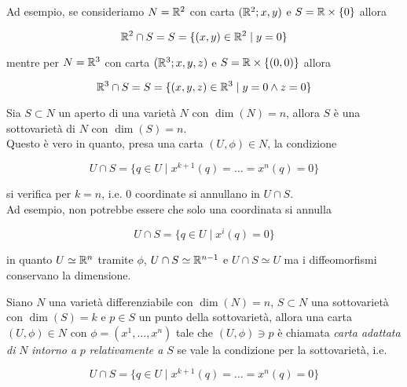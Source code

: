 Ad esempio, se consideriamo $ N = \mathbb{R}^{2} $ con carta $ (\mathbb{R}^{2};x,y) $ e $ S = \mathbb{R} \times \{0\} $ allora

\begin{equation}
	\mathbb{R}^{2} \cap S = S = \{ (x,y) \in \mathbb{R}^{2} \mid y=0 \}
\end{equation}

mentre per $ N = \mathbb{R}^{3} $ con carta $ (\mathbb{R}^{3};x,y,z) $ e $ S = \mathbb{R} \times \{(0,0)\} $ allora

\begin{equation}
	\mathbb{R}^{3} \cap S = S = \{ (x,y,z) \in \mathbb{R}^{3} \mid y = 0 \wedge z = 0 \}
\end{equation}

\begin{remark}\label{subvar-open}
	Sia $ S \subset N $ un aperto di una varietà $ N $ con $ \dim(N)=n $, allora $ S $ è una sottovarietà di $ N $ con $ \dim(S)=n $.\\
	Questo è vero in quanto, presa una carta $ (U,\phi) \in N $, la condizione
	
	\begin{equation}
		U \cap S = \{ q \in U \mid x^{k+1}(q) = \dots = x^{n}(q) = 0 \}
	\end{equation}

	si verifica per $ k=n $, i.e. 0 coordinate si annullano in $ U \cap S $.\\
	Ad esempio, non potrebbe essere che solo una coordinata si annulla
	
	\begin{equation}
		U \cap S = \{ q \in U \mid x^{i}(q) = 0 \}
	\end{equation}

	in quanto $ U \simeq \mathbb{R}^{n} $ tramite $ \phi $, $ U \cap S \simeq \mathbb{R}^{n-1} $ e $ U \cap S \simeq U $ ma i diffeomorfismi conservano la dimensione.
\end{remark}

Siano $ N $ una varietà differenziabile con $ \dim(N)=n $, $ S \subset N $ una sottovarietà con $ \dim(S)=k $ e $ p \in S $ un punto della sottovarietà, allora una carta $ (U,\phi) \in N $ con $ \phi = (x^{1},\dots,x^{n}) $ tale che $ (U,\phi) \ni p $ è chiamata \textit{carta adattata di} $ N $ \textit{intorno a} $ p $ \textit{relativamente a} $ S $ se vale la condizione per la sottovarietà, i.e.

\begin{equation}
	U \cap S = \{ q \in U \mid x^{k+1}(q) = \dots = x^{n}(q) = 0 \}
\end{equation}

